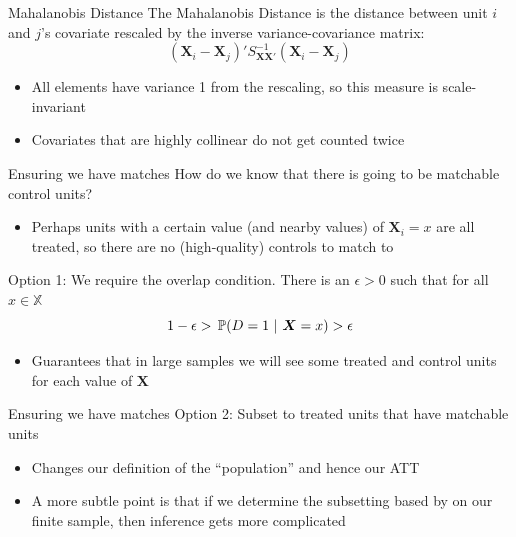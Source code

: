 \documentclass[aspectratio=169,t,11pt,table]{beamer}
\begin{document}
\begin{frame}{Mahalanobis Distance}
  The \alert{Mahalanobis Distance} is the distance between unit $i$ and $j$'s covariate rescaled by the inverse variance-covariance matrix:
  $$
    (\bm{X}_i - \bm{X}_j)' S_{\bm{X}\bm{X}'}^{-1} (\bm{X}_i - \bm{X}_j)
  $$
  \begin{itemize}
    \item All elements have variance 1 from the rescaling, so this measure is scale-invariant
    
    \item Covariates that are highly collinear do not get counted twice
    
  \end{itemize}
\end{frame}


\begin{frame}{Ensuring we have matches}
  How do we know that there is going to be matchable control units?
  \begin{itemize}
    \item Perhaps units with a certain value (and nearby values) of $\bm{X}_i = x$ are all treated, so there are no (high-quality) controls to match to
  \end{itemize}

  \pause
  \bigskip
  Option 1: We require the \alert{overlap} condition. There is an $\epsilon > 0$ such that for all $x \in \mathbb{X}$
  $$
    1 - \epsilon > \prob{D = 1}{\bm{X} = x} > \epsilon
  $$
  \begin{itemize}
    \item Guarantees that in large samples we will see some treated and control units for each value of $\bm{X}$
  \end{itemize}
\end{frame}

\begin{frame}{Ensuring we have matches}
  Option 2: Subset to treated units that have matchable units
  \begin{itemize}
    \item Changes our definition of the ``population'' and hence our ATT
    
    \item A more subtle point is that if we determine the subsetting based by on our finite sample, then inference gets more complicated
  \end{itemize}
\end{frame}
\end{document}
